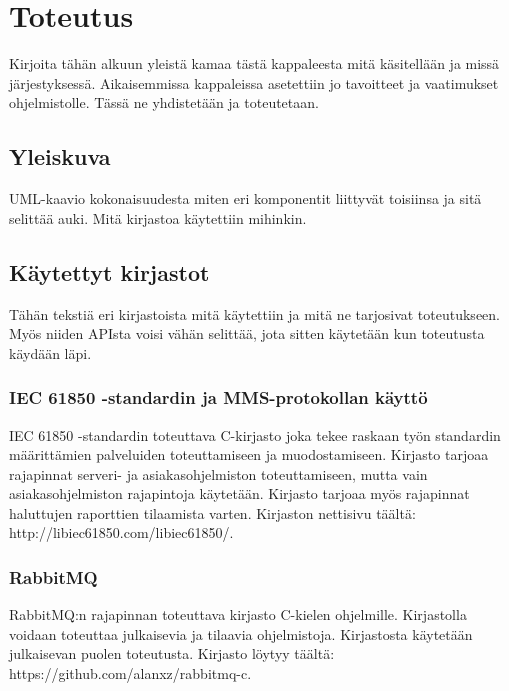 \chapter{Toteutus}
\label{ch:toteutus}
\begin{it}
	Kirjoita tähän alkuun yleistä kamaa tästä kappaleesta mitä käsitellään ja missä järjestyksessä. Aikaisemmissa kappaleissa asetettiin jo tavoitteet ja vaatimukset ohjelmistolle. Tässä ne yhdistetään ja toteutetaan.
\end{it}


\section{Yleiskuva}
\begin{it}
	UML-kaavio kokonaisuudesta miten eri komponentit liittyvät toisiinsa ja sitä selittää auki. Mitä kirjastoa käytettiin mihinkin.
\end{it}


\section{Käytettyt kirjastot}
\begin{it}
	Tähän tekstiä eri kirjastoista mitä käytettiin ja mitä ne tarjosivat toteutukseen. Myös niiden APIsta voisi vähän selittää, jota sitten käytetään kun toteutusta käydään läpi.
\end{it}


\subsection{IEC 61850 -standardin ja MMS-protokollan käyttö}
\begin{it}
	IEC 61850 -standardin toteuttava C-kirjasto joka tekee raskaan työn standardin määrittämien palveluiden toteuttamiseen ja muodostamiseen. Kirjasto tarjoaa rajapinnat serveri- ja asiakasohjelmiston toteuttamiseen, mutta vain asiakasohjelmiston rajapintoja käytetään. Kirjasto tarjoaa myös rajapinnat haluttujen raporttien tilaamista varten. Kirjaston nettisivu täältä: http://libiec61850.com/libiec61850/.
\end{it}


\subsection{RabbitMQ}
\begin{it}
	RabbitMQ:n rajapinnan toteuttava kirjasto C-kielen ohjelmille. Kirjastolla voidaan toteuttaa julkaisevia ja tilaavia ohjelmistoja. Kirjastosta käytetään julkaisevan puolen toteutusta. Kirjasto löytyy täältä: https://github.com/alanxz/rabbitmq-c.
\end{it}


